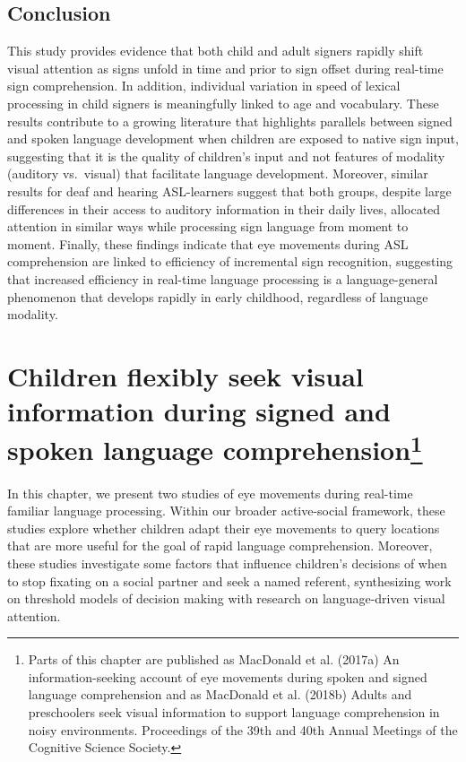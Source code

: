 \documentclass[oneside]{report}
\begin{document}
\section{Conclusion}\label{conclusion}

This study provides evidence that both child and adult signers rapidly
shift visual attention as signs unfold in time and prior to sign offset
during real-time sign comprehension. In addition, individual variation
in speed of lexical processing in child signers is meaningfully linked
to age and vocabulary. These results contribute to a growing literature
that highlights parallels between signed and spoken language development
when children are exposed to native sign input, suggesting that it is
the quality of children's input and not features of modality (auditory
vs.~visual) that facilitate language development. Moreover, similar
results for deaf and hearing ASL-learners suggest that both groups,
despite large differences in their access to auditory information in
their daily lives, allocated attention in similar ways while processing
sign language from moment to moment. Finally, these findings indicate
that eye movements during ASL comprehension are linked to efficiency of
incremental sign recognition, suggesting that increased efficiency in
real-time language processing is a language-general phenomenon that
develops rapidly in early childhood, regardless of language modality.

\chapter[Children flexibly seek visual information during signed and
spoken language comprehension]{\texorpdfstring{Children flexibly seek
visual information during signed and spoken language
comprehension\footnote{Parts of this chapter are published as MacDonald
  et al. (2017a) An information-seeking account of eye movements during
  spoken and signed language comprehension and as MacDonald et al.
  (2018b) Adults and preschoolers seek visual information to support
  language comprehension in noisy environments. Proceedings of the 39th
  and 40th Annual Meetings of the Cognitive Science Society.}}{Children flexibly seek visual information during signed and spoken language comprehension}}\label{children-flexibly-seek-visual-information-during-signed-and-spoken-language-comprehension}


In this chapter, we present two studies of eye movements during
real-time familiar language processing. Within our broader active-social
framework, these studies explore whether children adapt their eye
movements to query locations that are more useful for the goal of rapid
language comprehension. Moreover, these studies investigate some factors
that influence children's decisions of when to stop fixating on a social
partner and seek a named referent, synthesizing work on threshold models
of decision making with research on language-driven visual attention.
\end{document}
